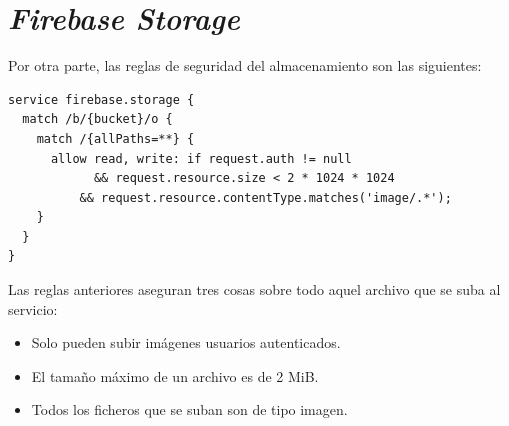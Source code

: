 \documentclass[twoside]{report}
\begin{document}
\clearpage

\section*{\textit{Firebase Storage}}

Por otra parte, las reglas de seguridad del almacenamiento son las siguientes:

\begin{lstlisting}
service firebase.storage {
  match /b/{bucket}/o {
    match /{allPaths=**} {
      allow read, write: if request.auth != null 
      		&& request.resource.size < 2 * 1024 * 1024
          && request.resource.contentType.matches('image/.*');
    }
  }
}
\end{lstlisting}

Las reglas anteriores aseguran tres cosas sobre todo aquel archivo que se suba al servicio:
\begin{itemize}
\item Solo pueden subir imágenes usuarios autenticados.
\item El tamaño máximo de un archivo es de 2 MiB.
\item Todos los ficheros que se suban son de tipo imagen.
\end{itemize}
\end{document}
